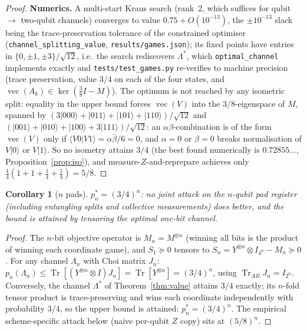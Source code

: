 \documentclass[11pt]{article}
\newtheorem{corollary}[theorem]{Corollary}
\theoremstyle{definition}
\newcommand{\tr}{\operatorname{Tr}}
\begin{document}
\begin{proof}
\textbf{Numerics.}  A multi-start Kraus search (rank~2, which suffices for
qubit $\to$ two-qubit channels) converges to value $0.75 + O(10^{-13})$, the
$\pm10^{-13}$ slack being the trace-preservation tolerance of the constrained
optimiser (\texttt{channel\_splitting\_value}, \texttt{results/games.json});
its fixed points have entries in
$\{0, \pm 1, \pm 3\}/\sqrt{12}$, i.e.\ the search rediscovers $\Lambda^\ast$,
which \texttt{optimal\_channel} implements exactly and
\texttt{tests/test\_games.py} re-verifies to machine precision (trace
preservation, value $3/4$ on each of the four states, and
$\operatorname{vec}(A_k) \in \ker(\tfrac38 I - M)$).
The optimum is not reached by any isometric split: equality in the upper
bound forces $\operatorname{vec}(V)$ into the $3/8$-eigenspace of $M$, spanned
by $(3|000\rangle + |011\rangle + |101\rangle + |110\rangle)/\sqrt{12}$ and
$(|001\rangle + |010\rangle + |100\rangle + 3|111\rangle)/\sqrt{12}$: an
$\alpha\beta$-combination is of the form $\operatorname{vec}(V)$ only if
$\langle V0 | V1\rangle = \alpha\bar\beta/6 = 0$, and $\alpha = 0$ or
$\beta = 0$ breaks normalisation of $V|0\rangle$ or $V|1\rangle$.  So no
isometry attains $3/4$ (the best found numerically is $0.72855\ldots$,
Proposition~\ref{prop:iso}), and measure-$Z$-and-reprepare achieves only
$\tfrac14(1 + 1 + \tfrac14 + \tfrac14) = 5/8$.
\end{proof}

\begin{corollary}[$n$ pads]\label{cor:nbit}
$p_n^\ast = (3/4)^n$: no joint attack on the $n$-qubit pad register
(including entangling splits and collective measurements) does better, and the
bound is attained by tensoring the optimal one-bit channel.
\end{corollary}

\begin{proof}
The $n$-bit objective operator is $M_n = M^{\otimes n}$ (winning all bits is the
product of winning each coordinate game), and $S_1 \succeq 0$ tensors to
$S_n = Y^{\otimes n} \otimes I_{4^n} - M_n \succeq 0$.  For any channel
$\Lambda_n$ with Choi matrix $J_n$:
$p_n(\Lambda_n) \le \tr[(Y^{\otimes n} \otimes I) J_n] = \tr[Y^{\otimes n}] = (3/4)^n$,
using $\tr_{AB} J_n = I_{2^n}$.  Conversely, the channel $\Lambda^\ast$ of
Theorem~\ref{thm:value} attains $3/4$ exactly; its $n$-fold tensor product is
trace-preserving and wins each coordinate independently with probability
$3/4$, so the upper bound is attained: $p_n^\ast = (3/4)^n$.  The empirical
scheme-specific attack below (naive per-qubit $Z$ copy) sits at $(5/8)^n$.
\end{proof}
\end{document}
